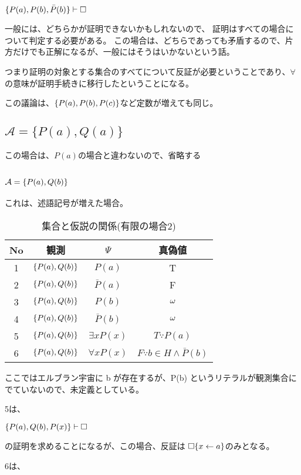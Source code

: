 \documentclass[10pt, oneside]{jarticle}   	%
\begin{document}
$\{P(a), P(b), \bar P(b)\} \vdash \Box$

一般には、どちらかが証明できないかもしれないので、
証明はすべての場合について判定する必要がある。
この場合は、どちらであっても矛盾するので、片方だけでも正解になるが、一般にはそうはいかないという話。


つまり証明の対象とする集合のすべてについて反証が必要ということであり、$\forall$の意味が証明手続きに移行したということになる。

この議論は、$\{{P(a), P(b), P(c)}\}$など定数が増えても同じ。
\subsection{$\mathcal{A}=\{P(a), Q(a)\}$}
この場合は、$P(a)$の場合と違わないので、省略する

\subsection{$\mathcal{A}=\{{P(a), Q(b)}\}$}
これは、述語記号が増えた場合。

\begin{table}[htbp]
 \centering
 \begin{tabular}{|c|c|c|c|}\hline
   No & 観測 & $\Psi$ & 真偽値 \\ \hline
   1 & $\{{P(a), Q(b)}\}$ & $P(a)$ & T \\ \hline
   2 & $\{{P(a), Q(b)}\}$ & $\bar P(a)$ & F \\ \hline
   3 & $\{{P(a), Q(b)}\}$ & $P(b)$ & $\omega$ \\ \hline
   4 & $\{{P(a), Q(b)}\}$ & $\bar P(b)$ & $\omega$ \\ \hline
   5 & $\{{P(a), Q(b)}\}$& $\exists x P(x)$ & $T \because P(a)$ \\ \hline
   6 & $\{{P(a), Q(b)}\}$ & $\forall x P(x)$ & $F \because b \in H \land \bar P(b)$ \\ \hline
 \end{tabular}
 \caption{集合と仮説の関係(有限の場合2)}
 \label{tab:ex0103}
\end{table}

ここではエルブラン宇宙に b が存在するが、P(b) というリテラルが観測集合にでていないので、未定義としている。

5は、

$\{{P(a), Q(b), P(x)}\} \vdash \Box$ 

の証明を求めることになるが、この場合、反証は $\Box\{x \leftarrow a\}$のみとなる。

6は、
\end{document}
